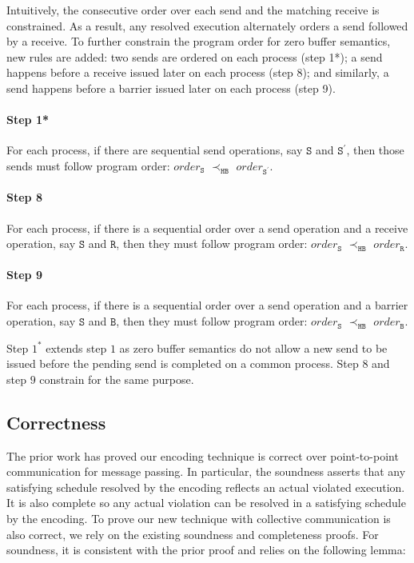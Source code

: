 Intuitively, the consecutive order over each send and the matching receive is constrained. As a result, any resolved execution alternately orders a send followed by a receive. To further constrain the program order for zero buffer semantics, new rules are added: two sends are ordered on each process (step 1*); a send happens before a receive issued later on each process (step 8); and similarly, a send happens before a barrier issued later on each process (step 9).

\paragraph*{Step 1*} For each process, if there are sequential send
operations, say $\mathtt{S}$ and $\mathtt{S^\prime}$, then those
sends must follow program order: $\mathit{order}_\mathtt{S}$
$\prec_\mathtt{HB}$ $\mathit{order}_\mathtt{S^\prime}$.

\paragraph*{Step 8} For each process, if there is a sequential order over a send operation and a receive operation, say $\mathtt{S}$ and $\mathtt{R}$, then they must follow program order: 
$\mathit{order}_\mathtt{S}$
$\prec_\mathtt{HB}$ $\mathit{order}_\mathtt{R}$.

\paragraph*{Step 9} For each process, if there is a sequential order over a send operation and a barrier operation, say $\mathtt{S}$ and $\mathtt{B}$, then they must follow program order: 
$\mathit{order}_\mathtt{S}$
$\prec_\mathtt{HB}$ $\mathit{order}_\mathtt{B}$.

Step $1^*$ extends step $1$ as zero buffer semantics do not allow a new send to be issued before the pending send is completed on a common process. Step $8$ and step $9$ constrain for the same purpose.

\subsection{Correctness}

The prior work \cite{DBLP:conf/kbse/HuangMM13} has proved our encoding technique is correct over point-to-point communication for message passing. In particular, the soundness asserts that any satisfying schedule resolved by the encoding reflects an actual violated execution. It is also complete so any actual violation can be resolved in a satisfying schedule by the encoding. To prove our new technique with collective communication is also correct, we rely on the existing soundness and completeness proofs. For soundness, it is consistent with the prior proof and relies on the following lemma: 

